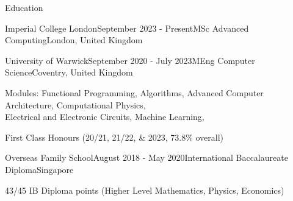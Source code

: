 \documentclass{resume}
\begin{document}
    \begin{rSection}{Education}
        \begin{rSubsection}{Imperial College London}{September 2023 - Present}{MSc Advanced Computing}{London, United Kingdom}{}
            \item 
        \end{rSubsection}
        \begin{rSubsection}{University of Warwick}{September 2020 - July 2023}{MEng Computer Science}{Coventry, United Kingdom}{}
        \item Modules: Functional Programming, Algorithms, Advanced Computer Architecture, Computational Physics, \\Electrical and Electronic Circuits, Machine Learning, 
        \item First Class Honours (20/21, 21/22, \& 2023, 73.8\% overall)
        \end{rSubsection}
        \begin{rSubsection}{Overseas Family School}{August 2018 - May 2020}{International Baccalaureate Diploma}{Singapore}{}
        \item 43/45 IB Diploma points (Higher Level Mathematics, Physics, Economics)
        \end{rSubsection}
    \end{rSection}
\end{document}
